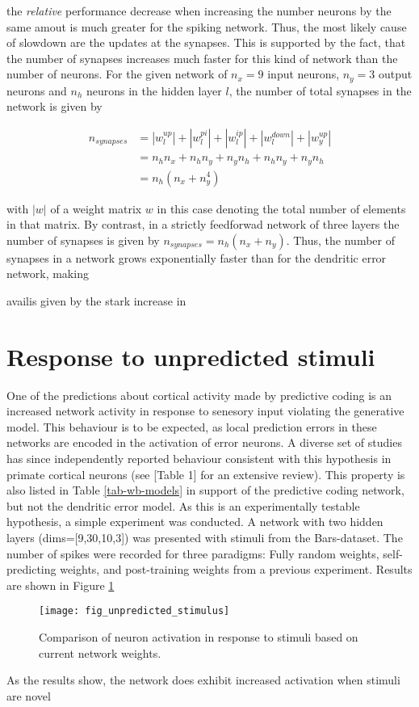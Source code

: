 the \textit{relative} performance decrease when increasing the number neurons by the same amout is much greater for the
spiking network. Thus, the most likely cause of slowdown are the updates at the synapses. This is supported by the fact,
that the number of synapses increases much faster for this kind of network than the number of neurons. For the given
network of $n_{x} = 9$ input neurons, $n_y = 3$ output neurons and $n_{h}$ neurons in the hidden layer $l$, the number
of total synapses in the network is given by

\begin{align}
    n_{synapses} & = |w_{l}^{up}| + |w_{l}^{pi}| + |w_{l}^{ip}| + |w_{l}^{down}| + |w_{y}^{up}| \\
                 & = n_h n_x + n_h n_y + n_y n_h  + n_h n_y + n_y  n_h                          \\
                 & = n_h (n_x + n_y^4)
\end{align}

with $|w|$ of a weight matrix $w$ in this case denoting the total number of elements in that matrix. By contrast, in a
strictly feedforwad network of three layers the number of synapses is given by $n_{synapses} = n_h (n_x + n_y)$. Thus,
the number of synapses in a network grows exponentially faster than for the dendritic error network, making 

availis given by the stark increase in

\section{Response to unpredicted stimuli}

One of the predictions about cortical activity made by predictive coding is an increased network activity in response to
senesory input violating the generative model. This behaviour is to be expected, as local prediction errors in these
networks are encoded in the activation of error neurons. A diverse set of studies has since independently reported
behaviour consistent with this hypothesis in primate cortical neurons (see \citep{bastos2012canonical}[Table 1] for an
extensive review). This property is also listed in Table \ref{tab-wb-models} in support of the predictive coding
network, but not the dendritic error model. As this is an experimentally testable hypothesis, a simple experiment was
conducted. A network with two hidden layers (dims=[9,30,10,3]) was presented with stimuli from the Bars-dataset. The
number of spikes were recorded for three paradigms: Fully random weights, self-predicting weights, and post-training
weights from a previous experiment. Results are shown in Figure \ref{fig-stimulus-response}

\begin{figure}[h]
    \centering
    \texttt{[image: fig\_unpredicted\_stimulus]}
    \caption{Comparison of neuron activation in response to stimuli based on current network weights.}
    \label{fig-stimulus-response}
\end{figure}

As the results show, the network does exhibit increased activation when stimuli are novel



